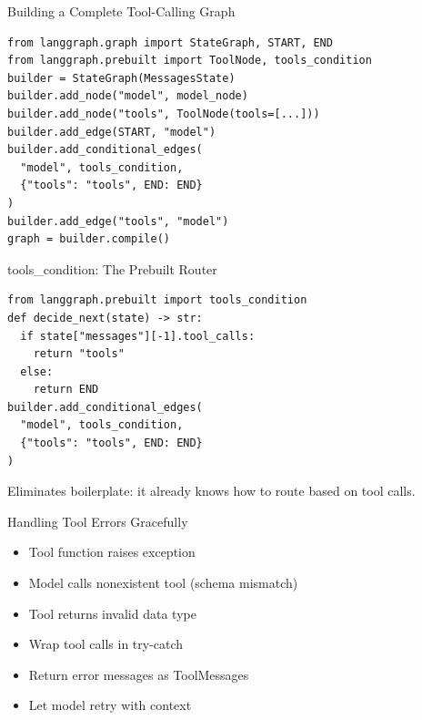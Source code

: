 \documentclass[aspectratio=169,11pt]{beamer}
\begin{document}
\begin{frame}[fragile]{Building a Complete Tool-Calling Graph}
  \begin{codebox}
    \begin{lstlisting}
from langgraph.graph import StateGraph, START, END
from langgraph.prebuilt import ToolNode, tools_condition
builder = StateGraph(MessagesState)
builder.add_node("model", model_node)
builder.add_node("tools", ToolNode(tools=[...]))
builder.add_edge(START, "model")
builder.add_conditional_edges(
  "model", tools_condition,
  {"tools": "tools", END: END}
)
builder.add_edge("tools", "model")
graph = builder.compile()
    \end{lstlisting}
  \end{codebox}
\end{frame}

\begin{frame}[fragile]{tools\_condition: The Prebuilt Router}
  \begin{codebox}
    \begin{lstlisting}
from langgraph.prebuilt import tools_condition
def decide_next(state) -> str:
  if state["messages"][-1].tool_calls:
    return "tools"
  else:
    return END
builder.add_conditional_edges(
  "model", tools_condition,
  {"tools": "tools", END: END}
)
    \end{lstlisting}
  \end{codebox}
  \vspace{0.1cm}
  \begin{tipbox}
    Eliminates boilerplate: it already knows how to route based on tool calls.
  \end{tipbox}
\end{frame}

\begin{frame}{Handling Tool Errors Gracefully}
  \begin{warningbox}
    \setlength{\itemsep}{1pt}
    \begin{itemize}
      \item Tool function raises exception
      \item Model calls nonexistent tool (schema mismatch)
      \item Tool returns invalid data type
    \end{itemize}
  \end{warningbox}
  \vspace{0.1cm}
  \begin{conceptbox}
    \setlength{\itemsep}{1pt}
    \begin{itemize}
      \item Wrap tool calls in try-catch
      \item Return error messages as ToolMessages
      \item Let model retry with context
    \end{itemize}
  \end{conceptbox}
\end{frame}
\end{document}
